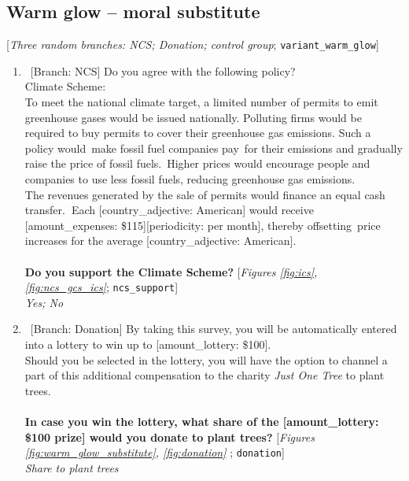  \subsection*{Warm glow -- moral substitute} 
 [\textit{Three random branches: NCS; Donation; control group};  \verb|variant_warm_glow|] 
 \begin{enumerate}[resume] 
\item ~[Branch: NCS] \label{q:ncs_support} Do you agree with the following policy?
~\\
Climate Scheme:~\\
To meet the national climate target, a limited number of permits to emit greenhouse gases would be issued nationally. Polluting firms would be required to buy permits to cover their greenhouse gas emissions. Such a policy would~make fossil fuel companies pay~for their emissions and gradually raise the price of fossil fuels.~Higher prices would encourage people and companies to use less fossil fuels, reducing greenhouse gas emissions.\\
The revenues generated by the sale of permits would finance an equal cash transfer.\textbf{~}Each [country\_adjective: American] would receive [amount\_expenses: \$115][periodicity: per month], thereby offsetting~price increases for the average [country\_adjective: American].\\
~\\
\textbf{Do you support the Climate Scheme?} [\textit{Figures \ref{fig:ics}, \ref{fig:ncs_gcs_ics}}; 
\verb|ncs_support|]
  \\ \textit{Yes; No}

\item ~[Branch: Donation] \label{q:donation} By taking this survey, you will be automatically entered into a lottery to win up to [amount\_lottery: \$100]. \\Should you be selected in the lottery, you will have the option to channel a part of this additional compensation to the charity \textit{Just One Tree} to plant trees.\\\\\textbf{In case you win the lottery, what share of the [amount\_lottery: \$100 prize] would you donate to plant trees?} [\textit{Figures \ref{fig:warm_glow_substitute}, \ref{fig:donation}
}; 
\verb|donation|]
  \\ \textit{Share to plant trees}

\end{enumerate} 

